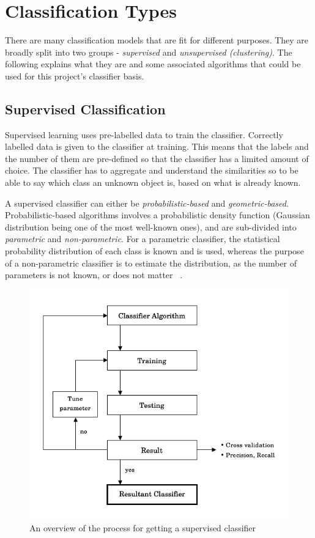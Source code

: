 \documentclass[11pt,openright,a4paper]{report}
\begin{document}
\section{Classification Types}
There are many classification models that are fit for different purposes. They are broadly split into two groups - \textit{supervised} and \textit{unsupervised (clustering)}. The following explains what they are and some associated algorithms that could be used for this project's classifier basis.

\subsection{Supervised Classification}
Supervised learning uses pre-labelled data to train the classifier. Correctly labelled data is given to the classifier at training. This means that the labels and the number of them are pre-defined so that the classifier has a limited amount of choice. The classifier has to aggregate and understand the similarities so to be able to say which class an unknown object is, based on what is already known.~\cite{class-analysis} 

A supervised classifier can either be \textit{probabilistic-based} and \textit{geometric-based}. Probabilistic-based algorithms involves a probabilistic density function (Gaussian distribution being one of the most well-known ones), and are sub-divided into \textit{parametric} and \textit{non-parametric}. For a parametric classifier, the statistical probability distribution of each class is known and is used, whereas the purpose of a non-parametric classifier is to estimate the distribution, as the number of parameters is not known, or does not matter \cite{class-analysis}~\cite{hall-notes}.

\begin{figure}[h]
  \centering\includegraphics[scale=0.6]{supervised-process.png}
  \caption{An overview of the process for getting a supervised classifier~\cite{class-analysis}}
  \label{fig:supervised-process}
\end{figure}
\end{document}
